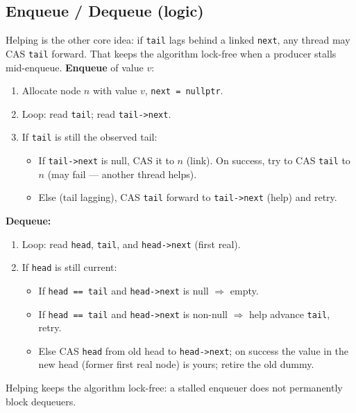 \subsection{Enqueue / Dequeue (logic)}
\label{subsec:ms-enqueue-dequeue}
Helping is the other core idea: if \texttt{tail} lags behind a linked \texttt{next}, 
any thread may CAS \texttt{tail} forward. That keeps the algorithm lock-free when a 
producer stalls mid-enqueue.
\newline
\textbf{Enqueue} of value $v$:
\begin{enumerate}
    \item Allocate node $n$ with value $v$, \texttt{next = nullptr}.
    \item Loop: read \texttt{tail}; read \texttt{tail->next}.
    \item If \texttt{tail} is still the observed tail:
          \begin{itemize}
              \item If \texttt{tail->next} is null, CAS it to $n$ (link). On success, 
                    try to CAS \texttt{tail} to $n$ (may fail --- another thread helps).
              \item Else (tail lagging), CAS \texttt{tail} forward to \texttt{tail->next} 
                    (help) and retry.
          \end{itemize}
\end{enumerate}
\textbf{Dequeue:}
\begin{enumerate}
    \item Loop: read \texttt{head}, \texttt{tail}, and \texttt{head->next} (first real).
    \item If \texttt{head} is still current:
          \begin{itemize}
              \item If \texttt{head == tail} and \texttt{head->next} is null $\Rightarrow$ empty.
              \item If \texttt{head == tail} and \texttt{head->next} is non-null $\Rightarrow$ 
                    help advance \texttt{tail}, retry.
              \item Else CAS \texttt{head} from old head to \texttt{head->next}; on success 
                    the value in the new head (former first real node) is yours; retire 
                    the old dummy.
          \end{itemize}
\end{enumerate}
Helping keeps the algorithm lock-free: a stalled enqueuer does not permanently block 
dequeuers.


